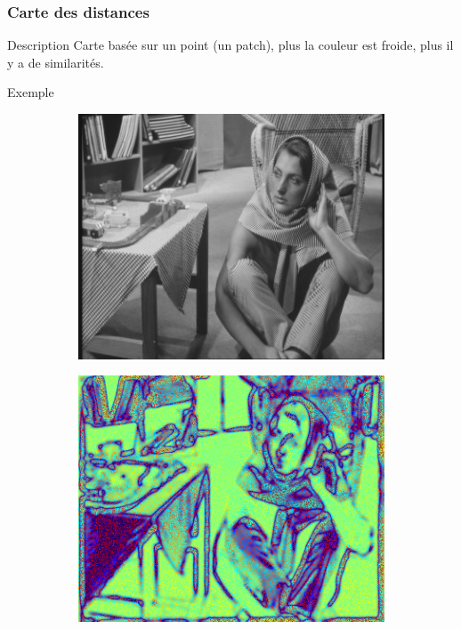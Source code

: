 \documentclass{beamer}
\begin{document}
\begin{frame}
    \frametitle{Carte des distances}
    \begin{block}{Description}
        Carte basée sur un point (un patch), plus la couleur est froide, plus il y a de similarités.
    \end{block}
    \begin{exampleblock}{Exemple}
        \begin{figure}[h]
            \centering
            \begin{subfigure}{0.35\textwidth}
                \includegraphics[width=\textwidth]{img/barbara}
                \caption{}
            \end{subfigure}
            \begin{subfigure}{0.35\textwidth}
                \includegraphics[width=\textwidth]{img/barbara_distanceMap}
                \caption{}
            \end{subfigure}
        \end{figure}
    \end{exampleblock}
\end{frame}
\end{document}

